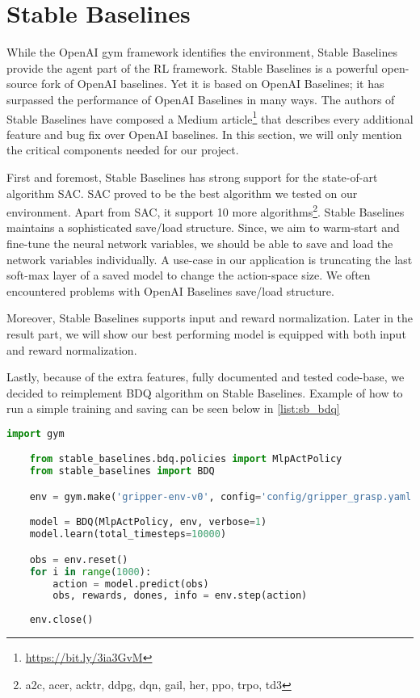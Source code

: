 \section{Stable Baselines}


While the OpenAI gym framework identifies the environment, Stable Baselines provide the agent part of the RL framework. Stable Baselines is a powerful open-source fork of OpenAI baselines. Yet it is based on OpenAI Baselines; it has surpassed the performance of OpenAI Baselines in many ways. 
The authors of Stable Baselines have composed a Medium article\footnote{\url{https://bit.ly/3ia3GvM}} that describes every additional feature and bug fix over OpenAI baselines. In this section, we will only mention the critical components needed for our project.

First and foremost, Stable Baselines has strong support for the state-of-art algorithm SAC. SAC proved to be the best algorithm we tested on our environment. Apart from SAC, it support 10 more algorithms\footnote{a2c, 
acer,
acktr, 
ddpg, 
dqn,
gail, 
her, 
ppo, 
trpo, 
td3
}. Stable Baselines maintains a sophisticated save/load structure. Since, we aim to warm-start and fine-tune the neural network variables, we should be able to save and load the network variables individually. A use-case in our application is truncating the last soft-max layer of a saved model to change the action-space size. We often encountered problems with OpenAI Baselines save/load structure.

Moreover, Stable Baselines supports input and reward normalization. Later in the result part, we will show our best performing model is equipped with both input and reward normalization.

Lastly, because of the extra features, fully documented and tested code-base, we decided to reimplement BDQ algorithm on Stable Baselines. Example of how to run a simple training and saving can be seen below in \ref{list:sb_bdq}


\begin{lstlisting}[language=Python, caption=Example of training and saving BDQ algorithm on gripper-env, label=list:sb_bdq]
    import gym

    from stable_baselines.bdq.policies import MlpActPolicy
    from stable_baselines import BDQ

    env = gym.make('gripper-env-v0', config='config/gripper_grasp.yaml')

    model = BDQ(MlpActPolicy, env, verbose=1)
    model.learn(total_timesteps=10000)

    obs = env.reset()
    for i in range(1000):
        action = model.predict(obs)
        obs, rewards, dones, info = env.step(action)
    
    env.close()
\end{lstlisting}